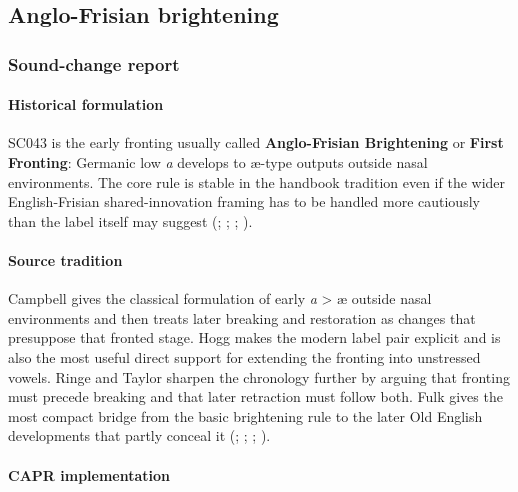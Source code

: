 \documentclass[
  british,
  a4paper,
]{article}
\begin{document}
\subsection{Anglo-Frisian brightening}\label{anglo-frisian-brightening}

\subsubsection{Sound-change report}\label{sound-change-report-27}

\paragraph{Historical formulation}\label{historical-formulation-27}

SC043 is the early fronting usually called \textbf{Anglo-Frisian
Brightening} or \textbf{First Fronting}: Germanic low \emph{a} develops
to æ-type outputs outside nasal environments. The core rule is stable in
the handbook tradition even if the wider English-Frisian
shared-innovation framing has to be handled more cautiously than the
label itself may suggest (; ;
;
).

\paragraph{Source tradition}\label{source-tradition-27}

Campbell gives the classical formulation of early \emph{a}
\textgreater{} æ outside nasal environments and then treats later
breaking and restoration as changes that presuppose that fronted stage.
Hogg makes the modern label pair explicit and is also the most useful
direct support for extending the fronting into unstressed vowels. Ringe
and Taylor sharpen the chronology further by arguing that fronting must
precede breaking and that later retraction must follow both. Fulk gives
the most compact bridge from the basic brightening rule to the later Old
English developments that partly conceal it
(;
;
; ).

\paragraph{CAPR implementation}\label{capr-implementation-27}
\end{document}
